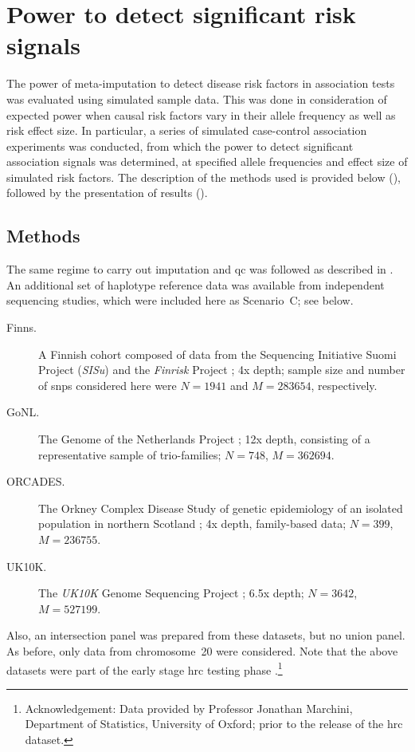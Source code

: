 %
\section{Power to detect significant risk signals}
\label{sec:metaimpute_power}
%

The power of meta-imputation to detect disease risk factors in association tests was evaluated using simulated sample data.
This was done in consideration of expected power when causal risk factors vary in their allele frequency as well as risk effect size.
In particular, a series of simulated case-control association experiments was conducted, from which the power to detect significant association signals was determined, at specified allele frequencies and effect size of simulated risk factors.
The description of the methods used is provided below (), followed by the presentation of results ().


%
\subsection{Methods}
\label{sec:meta_power_methods}
%

The same regime to carry out imputation and \gls{qc} was followed as described in .
An additional set of haplotype reference data was available from  independent sequencing studies, which were included here as Scenario~C; see below.
\begin{description}
	\item[Finns.] A Finnish cohort composed of data from the Sequencing Initiative Suomi Project (\emph{SISu}) and the \emph{Finrisk} Project \citep{Vartiainen:2010eb,Pajunen:2010ft,Lim:2014ir,Borodulin:2015bs}; 4x depth; sample size and number of \glspl{snp} considered here were ${N=\num{1941}}$ and ${M=\num{283654}}$, respectively.
	\item[GoNL.] The Genome of the Netherlands Project \citep{Boomsma:2013hf, Deelen:2014dq, GenomeoftheNetherlandsConsortium:2014gs}; 12x depth, consisting of a representative sample of  trio-families; ${N=\num{748}}$, ${M=\num{362694}}$.
	\item[ORCADES.] The Orkney Complex Disease Study of genetic epidemiology of an isolated population in northern Scotland \citep{McQuillan:2008fz}; 4x depth, family-based data; ${N=\num{399}}$, ${M=\num{236755}}$.
	\item[UK10K.] The \emph{UK10K} Genome Sequencing Project \citep{UKKConsortium:2015ii}; 6.5x depth; ${N=\num{3642}}$, ${M=\num{527199}}$.
\end{description}
Also, an intersection panel was prepared from these  datasets, but no union panel.
As before, only data from chromosome~20 were considered.
Note that the above datasets were part of the early stage \gls{hrc} testing phase \citep{McCarthy:2016gs}.\footnote{Acknowledgement: Data provided by Professor Jonathan Marchini, Department of Statistics, University of Oxford; prior to the release of the \gls{hrc} dataset.}


